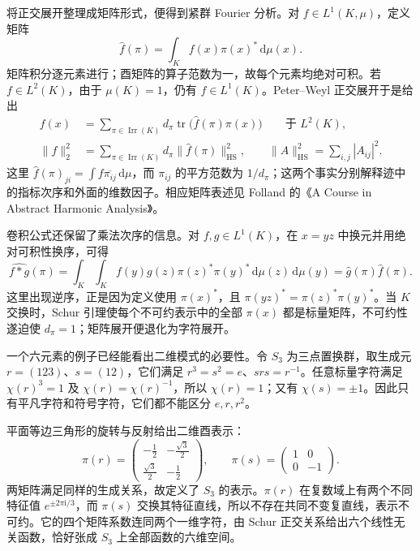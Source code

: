 将正交展开整理成矩阵形式，便得到紧群 Fourier 分析。对 \(f\in L^1(K,\mu)\)，定义矩阵
\[
 \widehat f(\pi)=\int_Kf(x)\pi(x)^*\,\mathrm d\mu(x).
\]
矩阵积分逐元素进行；酉矩阵的算子范数为一，故每个元素均绝对可积。若 \(f\in L^2(K)\)，由于 \(\mu(K)=1\)，仍有 \(f\in L^1(K)\)。Peter--Weyl 正交展开于是给出
\begin{align*}
 f(x)&=\sum_{\pi\in\operatorname{Irr}(K)}
       d_\pi\operatorname{tr}\bigl(\widehat f(\pi)\pi(x)\bigr)
       \qquad\text{于 }L^2(K),\\
 \|f\|_2^2&=\sum_{\pi\in\operatorname{Irr}(K)}
       d_\pi\|\widehat f(\pi)\|_{\mathrm{HS}}^2,
 \qquad \|A\|_{\mathrm{HS}}^2=\sum_{i,j}|A_{ij}|^2.
\end{align*}
这里 \(\widehat f(\pi)_{ji}=\int f\overline{\pi_{ij}}\,\mathrm d\mu\)，而 \(\pi_{ij}\) 的平方范数为 \(1/d_\pi\)；这两个事实分别解释迹中的指标次序和外面的维数因子。相应矩阵表述见 Folland 的《A Course in Abstract Harmonic Analysis》\cite[Section 5.3]{Folland2016Abstract}。

卷积公式还保留了乘法次序的信息。对 \(f,g\in L^1(K)\)，在 \(x=yz\) 中换元并用绝对可积性换序，可得
\[
 \widehat{f*g}(\pi)
 =\int_K\int_K f(y)g(z)\pi(z)^*\pi(y)^*
      \,\mathrm d\mu(z)\,\mathrm d\mu(y)
 =\widehat g(\pi)\widehat f(\pi).
\]
这里出现逆序，正是因为定义使用 \(\pi(x)^*\)，且 \(\pi(yz)^*=\pi(z)^*\pi(y)^*\)。当 \(K\) 交换时，Schur 引理使每个不可约表示中的全部 \(\pi(x)\) 都是标量矩阵，不可约性遂迫使 \(d_\pi=1\)；矩阵展开便退化为字符展开。

一个六元素的例子已经能看出二维模式的必要性。令 \(S_3\) 为三点置换群，取生成元 \(r=(123)\)、\(s=(12)\)，它们满足 \(r^3=s^2=e\)、\(srs=r^{-1}\)。任意标量字符满足 \(\chi(r)^3=1\) 及 \(\chi(r)=\chi(r)^{-1}\)，所以 \(\chi(r)=1\)；又有 \(\chi(s)=\pm1\)。因此只有平凡字符和符号字符，它们都不能区分 \(e,r,r^2\)。

平面等边三角形的旋转与反射给出二维酉表示：
\[
 \pi(r)=\begin{pmatrix}
 -\frac12&-\frac{\sqrt3}{2}\\[2pt]
 \frac{\sqrt3}{2}&-\frac12
 \end{pmatrix},\qquad
 \pi(s)=\begin{pmatrix}1&0\\0&-1\end{pmatrix}.
\]
两矩阵满足同样的生成关系，故定义了 \(S_3\) 的表示。\(\pi(r)\) 在复数域上有两个不同特征值 \(e^{\pm2\pi\mathrm i/3}\)，而 \(\pi(s)\) 交换其特征直线，所以不存在共同不变复直线，表示不可约。它的四个矩阵系数连同两个一维字符，由 Schur 正交关系给出六个线性无关函数，恰好张成 \(S_3\) 上全部函数的六维空间。

